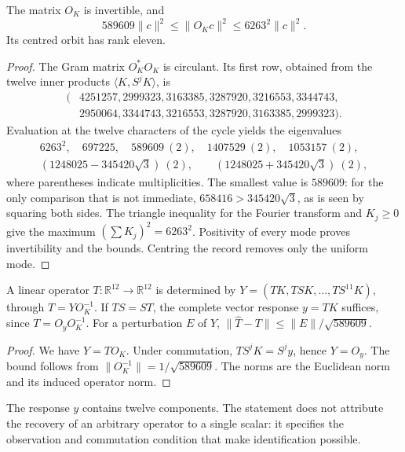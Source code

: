 \begin{theorem}
\label{thm:acoplamiento-orbita}
The matrix \(O_K\) is invertible, and
\[
 589609\|c\|^2\leq\|O_Kc\|^2\leq6263^2\|c\|^2.
\]
Its centred orbit has rank eleven.
\end{theorem}
\begin{proof}
The Gram matrix \(O_K^*O_K\) is circulant. Its first row, obtained from
the twelve inner products \(\langle K,S^jK\rangle\), is
\[
 \begin{aligned}
 (&4251257,2999323,3163385,3287920,3216553,3344743,\\
  &2950064,3344743,3216553,3287920,3163385,2999323).
 \end{aligned}
\]
Evaluation at the twelve characters of the cycle yields the
eigenvalues
\[
 \begin{gathered}
 6263^2,\quad697225,\quad
 589609\ (2),\quad1407529\ (2),\quad1053157\ (2),\\
 (1248025-345420\sqrt3)\ (2),\qquad
 (1248025+345420\sqrt3)\ (2),
 \end{gathered}
\]
where parentheses indicate multiplicities. The smallest value is
\(589609\): for the only comparison that is not immediate,
\(658416>345420\sqrt3\), as is seen by squaring both sides.
The triangle inequality for the Fourier transform and \(K_j\geq0\)
give the maximum \((\sum K_j)^2=6263^2\).
Positivity of every mode proves invertibility and the bounds.
Centring the record removes only the uniform mode.
\end{proof}

\begin{corollary}
\label{cor:acoplamiento-identificacion}
A linear operator \(T:\mathbb R^{12}\to\mathbb R^{12}\) is determined by
\(Y=(TK,TSK,\ldots,TS^{11}K)\), through \(T=YO_K^{-1}\).
If \(TS=ST\), the complete vector response \(y=TK\) suffices, since
\(T=O_yO_K^{-1}\). For a perturbation \(E\) of \(Y\),
\(\|\widehat T-T\|\leq\|E\|/\sqrt{589609}\).
\end{corollary}
\begin{proof}
We have \(Y=TO_K\). Under commutation, \(TS^jK=S^jy\), hence \(Y=O_y\).
The bound follows from
\(\|O_K^{-1}\|=1/\sqrt{589609}\).
The norms are the Euclidean norm and its induced operator norm.
\end{proof}

The response \(y\) contains twelve components. The statement does not
attribute the recovery of an arbitrary operator to a single scalar:
it specifies the observation and commutation condition that make identification possible.

